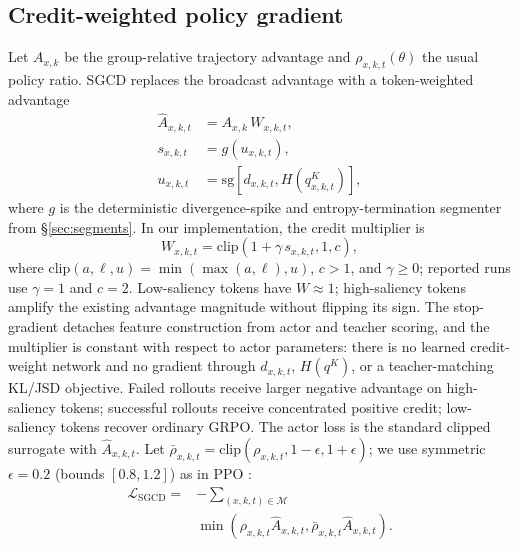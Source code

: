 \subsection{Credit-weighted policy gradient}
\label{sec:credit}
Let $A_{x,k}$ be the group-relative trajectory advantage and $\rho_{x,k,t}(\theta)$
the usual policy ratio. SGCD replaces the broadcast advantage with a
token-weighted advantage
\begin{equation}
  \begin{aligned}
  \widehat A_{x,k,t} &= A_{x,k} \, W_{x,k,t},\\
  s_{x,k,t} &= g(u_{x,k,t}),\\
  u_{x,k,t} &= \mathrm{sg}\!\left[d_{x,k,t},
  H(q_{x,k,t}^{K})\right],
  \end{aligned}
  \label{eq:weighted_adv}
\end{equation}
where $g$ is the deterministic divergence-spike and entropy-termination
segmenter from \S\ref{sec:segments}. In our implementation, the credit
multiplier is
\begin{equation}
  W_{x,k,t}
  = \mathrm{clip}\!\left(1+\gamma\,s_{x,k,t},
  1, c\right),
  \label{eq:weight_layer}
\end{equation}
where $\mathrm{clip}(a,\ell,u)=\min(\max(a,\ell),u)$, $c>1$, and
$\gamma\ge0$; reported runs use $\gamma{=}1$ and $c{=}2$. Low-saliency tokens
have $W\approx1$; high-saliency tokens amplify the existing advantage magnitude
without flipping its sign. The stop-gradient detaches feature construction from
actor and teacher scoring, and the multiplier is constant with respect to actor
parameters: there is no learned credit-weight network and no gradient through
$d_{x,k,t}$, $H(q^K)$, or a teacher-matching KL/JSD objective. Failed rollouts
receive larger negative advantage on high-saliency tokens; successful rollouts
receive concentrated positive credit; low-saliency tokens recover ordinary GRPO. The
actor loss is the standard
clipped surrogate with $\widehat A_{x,k,t}$. Let
$\bar\rho_{x,k,t}=\mathrm{clip}(\rho_{x,k,t},1-\epsilon,1+\epsilon)$; we use
symmetric $\epsilon{=}0.2$ (bounds $[0.8,1.2]$) as in PPO \citep{ppo2017}:
\begin{equation}
  \begin{aligned}
  \mathcal{L}_{\text{SGCD}}
  ={}& - \sum_{(x,k,t)\in\mathcal{M}} \\
     &\min\!\left(\rho_{x,k,t}\widehat A_{x,k,t},
      \bar\rho_{x,k,t}\widehat A_{x,k,t}\right).
  \end{aligned}
  \label{eq:sgcd_loss}
\end{equation}
